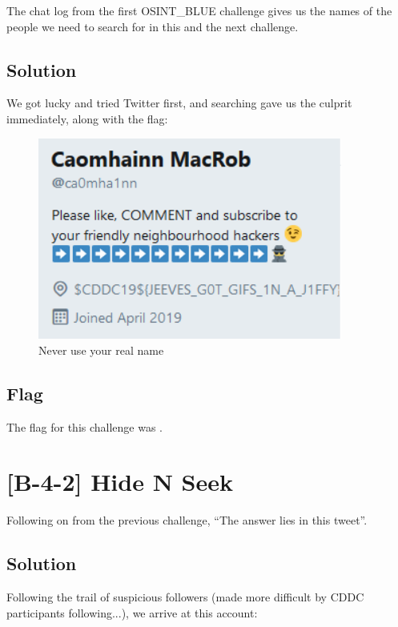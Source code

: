 	The chat log from the first OSINT\_BLUE challenge gives us the names of the people we need to search for in this and the next challenge.

	\subsection{Solution}

		We got lucky and tried Twitter first, and searching  gave us the culprit immediately, along with the flag:

		\begin{figure}[!htbp]\centering
			\includegraphics[width=100mm]{figures/osintblue/b41.png} \vspace{5mm}
			\caption{Never use your real name}
		\end{figure}


	\subsection{Flag}
		The flag for this challenge was .


\pagebreak
\section{[B-4-2] Hide N Seek}

	Following on from the previous challenge, \enquote{The answer lies in this tweet}.

	\subsection{Solution}
		Following the trail of suspicious followers (made more difficult by CDDC participants following...), we arrive at this account:

